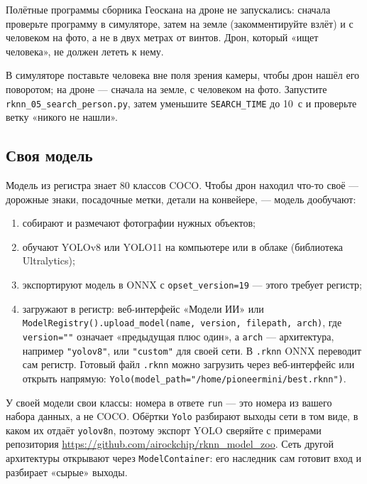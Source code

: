 \begin{warnbox}
Полётные программы сборника Геоскана на дроне не запускались: сначала проверьте программу в симуляторе, затем на земле (закомментируйте взлёт) и с человеком на фото, а не в двух метрах от винтов. Дрон, который «ищет человека», не должен лететь к нему.
\end{warnbox}

\begin{taskbox}
В симуляторе поставьте человека вне поля зрения камеры, чтобы дрон нашёл его поворотом; на дроне --- сначала на земле, с человеком на фото. Запустите \texttt{rknn\_05\_search\_person.py}, затем уменьшите \verb|SEARCH_TIME| до 10~с и проверьте ветку «никого не нашли».
\end{taskbox}

\subsection{Своя модель}

Модель из регистра знает 80 классов COCO. Чтобы дрон находил что-то своё --- дорожные знаки, посадочные метки, детали на конвейере, --- модель дообучают:
\begin{enumerate}
    \item собирают и размечают фотографии нужных объектов;
    \item обучают YOLOv8 или YOLO11 на компьютере или в облаке (библиотека Ultralytics);
    \item экспортируют модель в ONNX с \verb|opset_version=19| --- этого требует регистр;
    \item загружают в регистр: веб-интерфейс «Модели ИИ» или \verb|ModelRegistry().upload_model(name, version, filepath, arch)|, где \verb|version=""| означает «предыдущая плюс один», а \verb|arch| --- архитектура, например \verb|"yolov8"|, или \verb|"custom"| для своей сети. В \texttt{.rknn} ONNX переводит сам регистр. Готовый файл \texttt{.rknn} можно загрузить через веб-интерфейс или открыть напрямую: \verb|Yolo(model_path="/home/pioneermini/best.rknn")|.
\end{enumerate}
У своей модели свои классы: номера в ответе \verb|run| --- это номера из вашего набора данных, а не COCO. Обёртки \texttt{Yolo} разбирают выходы сети в том виде, в каком их отдаёт \texttt{yolov8n}, поэтому экспорт YOLO сверяйте с примерами репозитория \url{https://github.com/airockchip/rknn_model_zoo}. Сеть другой архитектуры открывают через \verb|ModelContainer|: его наследник сам готовит вход и разбирает «сырые» выходы.

